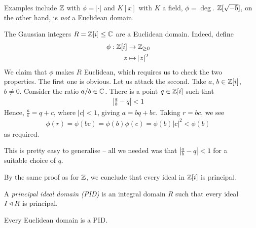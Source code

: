 \documentclass{../../template/note}
\begin{document}
    \begin{example*}
        Examples include $\mathbb Z$ with $\phi = |\cdot|$ and $K[x]$ with $K$ a field, $\phi = \deg$. $\mathbb Z[\sqrt{-5}]$, on the other hand, is \emph{not} a Euclidean domain.
    \end{example*}
    
    \begin{example*}
        The Gaussian integers $R = \mathbb Z[i] \leq \mathbb C$ are a Euclidean domain. Indeed, define
        \begin{align*}
            \phi: \mathbb Z[i] &\to \mathbb Z_{\geq 0} \\
            z &\mapsto |z|^2
        \end{align*}
        We claim that $\phi$ makes $R$ Euclidean, which requires us to check the two properties. The first one is obvious. Let us attack the second. Take $a$, $b \in \mathbb Z[i]$, $b \neq 0$. Consider the ratio $a/b \in \mathbb C$. There is a point $q \in \mathbb Z[i]$ such that
        \begin{align*}
            \left|\frac a b - q\right| < 1
        \end{align*}
        Hence, $\frac a b = q + c$, where $|c| < 1$, giving $a = bq + bc$. Taking $r=bc$, we see
        \begin{align*}
            \phi(r) = \phi(bc) = \phi(b)\phi(c) = \phi(b)|c|^2 < \phi(b)
        \end{align*}
        as required.
    \end{example*}
    
    \begin{remark*}
        This is pretty easy to generalise -- all we needed was that $\left|\frac a b - q\right| < 1$ for a suitable choice of $q$.
    \end{remark*}

    \begin{remark*}
        By the same proof as for $\mathbb Z$, we conclude that every ideal in $\mathbb Z[i]$ is principal.
    \end{remark*}
    
    \begin{definition}
        A \emph{principal ideal domain (PID)} is an integral domain $R$ such that every ideal $I \triangleleft R$ is principal.
    \end{definition}
    
    \begin{proposition}
        Every Euclidean domain is a PID.
    \end{proposition}
    
\end{document}
